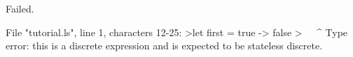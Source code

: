 \runverbatimfalse
{}
\begin{RunVerbatimMsg}
Failed.
\end{RunVerbatimMsg}
\begin{RunVerbatimErr}
File "tutorial.ls", line 1, characters 12-25:
>let first = true -> false
>            ^^^^^^^^^^^^^
Type error: this is a discrete expression and is expected to be stateless discrete.
\end{RunVerbatimErr}
